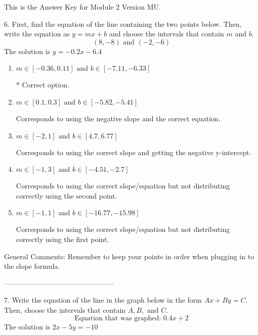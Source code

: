 \documentclass{article}[10pt]
\begin{document}
This is the Answer Key for Module 2 Version MU.

6. First, find the equation of the line containing the two points below. Then, write the equation as $ y=mx+b $ and choose the intervals that contain $m$ and $b$.
$$ (8, -8) \text{ and } (-2, -6) $$ 
The solution is $ y = -0.2 x - 6.4 $ 

\begin{enumerate}[label=\Alph*.] 
\item $ m \in [-0.36, 0.11] \text{ and } b \in [-7.11, -6.33] $ 

 * Correct option. 
\item $ m \in [0.1, 0.3] \text{ and } b \in [-5.82, -5.41] $ 

  Corresponds to using the negative slope and the correct equation. 
\item $ m \in [-2, 1] \text{ and } b \in [4.7, 6.77] $ 

  Corresponds to using the correct slope and getting the negative y-intercept. 
\item $ m \in [-1, 3] \text{ and } b \in [-4.51, -2.7] $ 

  Corresponds to using the correct slope/equation but not distributing correctly using the second point. 
\item $ m \in [-1, 1] \text{ and } b \in [-16.77, -15.98] $ 

  Corresponds to using the correct slope/equation but not distributing correctly using the first point. 
\end{enumerate} 
 
General Comments: Remember to keep your points in order when plugging in to the slope formula.

-----------------------------------------------

7. Write the equation of the line in the graph below in the form $Ax+By=C$. Then, choose the intervals that contain $A, B, \text{ and } C$.
$$ \text{Equation that was graphed: } 0.4 x + 2 $$ 
The solution is $ 2 x - 5 y = -10 $ 
\end{document}
